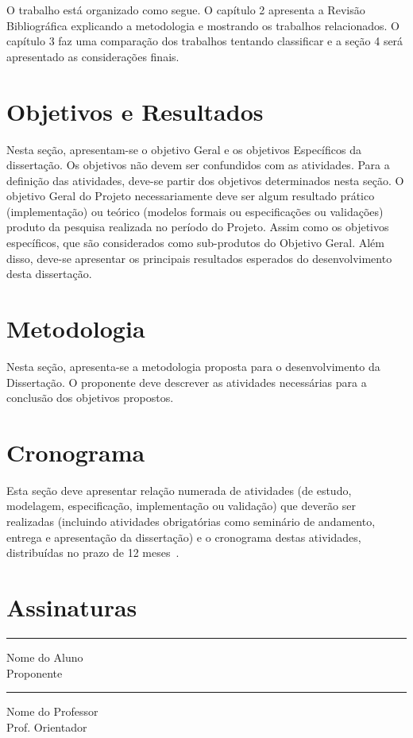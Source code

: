 \documentclass[diss-proposta,nocipinfo]{texufpel}
\begin{document}
O trabalho está organizado como segue. O capítulo 2 apresenta a Revisão Bibliográfica explicando a metodologia e mostrando os trabalhos relacionados. O capítulo 3 faz uma comparação dos trabalhos tentando classificar e a seção 4 será apresentado as considerações finais.

\chapter{Objetivos e Resultados}

Nesta seção, apresentam-se o objetivo Geral e os objetivos Específicos
da dissertação. Os objetivos não devem ser confundidos com as
atividades. Para a definição das atividades, deve-se partir dos
objetivos determinados nesta seção. O objetivo Geral do Projeto
necessariamente deve ser algum resultado prático (implementação) ou
teórico (modelos formais ou especificações ou validações) produto da
pesquisa realizada no período do Projeto. Assim como os objetivos
específicos, que são considerados como sub-produtos do Objetivo
Geral. Além disso, deve-se apresentar os principais resultados
esperados do desenvolvimento desta dissertação.

\chapter{Metodologia}

Nesta seção, apresenta-se a metodologia proposta para o
desenvolvimento da Dissertação. O proponente deve descrever as
atividades necessárias para a conclusão dos objetivos propostos. 

\chapter{Cronograma}

Esta seção deve apresentar relação numerada de atividades (de estudo,
modelagem, especificação, implementação ou validação) que deverão ser
realizadas (incluindo atividades obrigatórias como seminário de
andamento, entrega e apresentação da dissertação) e o cronograma
destas atividades, distribuídas no prazo de 12
meses~\cite{vonNeumann:1966:TSR}.




\chapter{Assinaturas}
\vspace{2cm}

\begin{center}
\rule{8cm}{.3mm}
\medskip

	Nome do Aluno\\
	Proponente

\end{center}

\vspace{4cm}

\begin{center}
\rule{8cm}{.3mm}
\medskip

	Nome do Professor\\
	Prof. Orientador

\end{center}
\end{document}
